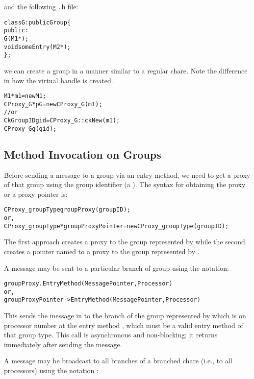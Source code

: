 and the following \texttt{.h} file:

\begin{alltt}
class G : public Group \{
  public:
    G(M1 *);
    void someEntry(M2 *);
\};
\end{alltt}

we can create a group in a manner similar to a regular
chare.  Note the difference in how the virtual handle is created.

\begin{alltt}
M1 *m1 = new M1;
CProxy_G *pG = new CProxy_G(m1);
  // or
CkGroupID gid = CProxy_G::ckNew(m1);
CProxy_G g(gid);
\end{alltt}

\subsection{Method Invocation on Groups}

Before sending a message to a group via an entry
method, we need to get a proxy of that group using the group identifier (a
). The syntax for obtaining the proxy or a proxy
pointer is:

\begin{alltt}
 CProxy_groupType groupProxy(groupID);
  or,
 CProxy_groupType *groupProxyPointer = new CProxy_groupType(groupID);
\end{alltt}

The first approach creates a proxy to the group represented by 
while the second creates a pointer named  to a proxy to
the group represented by . 

A message may be sent to a particular branch of group using the
notation:

\begin{alltt}
 groupProxy.EntryMethod(MessagePointer, Processor)
  or,
 groupProxyPointer->EntryMethod(MessagePointer, Processor)
\end{alltt}

This sends the message in  to the branch of
the group represented by  which is on processor number
 at the entry method , which must be a valid
entry method of that group type. This call is asynchronous and non-blocking; it
returns immediately after sending the message.

A message may be broadcast  to all branches of a branched
chare (i.e., to all processors) using the notation :

